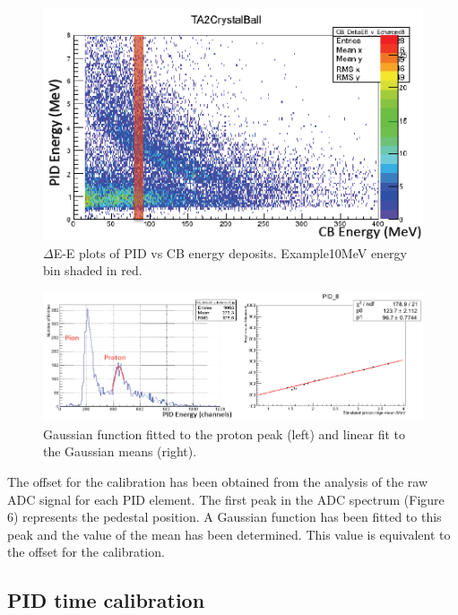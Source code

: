 \begin{figure}[H]
\begin{center}
\includegraphics[scale=0.6]{pictures/png/bananacali.png}
\caption{$\Delta$E-E plots of PID vs CB energy deposits. Example10MeV energy bin shaded in red.}
\label{bananacali}
\end{center}
\end{figure}

\begin{figure}[H]
\begin{center}
\includegraphics[scale=0.5]{pictures/png/bananagaus.png}
\caption{Gaussian function fitted to the proton peak (left) and linear fit to the Gaussian means (right).}
\label{bananagaus}
\end{center}
\end{figure}

\indent The offset for the calibration has been obtained from the analysis of the raw ADC signal for each PID element. The first peak in the ADC spectrum (Figure 6) represents the pedestal position. A Gaussian function has been fitted to this peak and the value of the mean has been determined. This value is equivalent to the offset for the calibration.

\subsection{PID time calibration}

